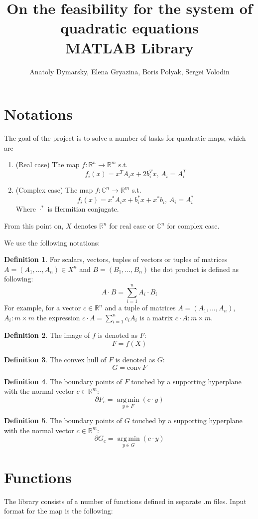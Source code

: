 \documentclass[a4paper]{article}
\title{On the feasibility for the system of quadratic equations\\MATLAB Library}
\date{}
\author{Anatoly Dymarsky, Elena Gryazina, Boris Polyak, Sergei Volodin}
\DeclareMathOperator*{\argmin}{arg\,min}
\newcommand{\conv}{\mbox{conv}\,}
\theoremstyle{definition}
\newtheorem{definition}{Definition}[section]
\begin{document}
\maketitle
\section{Notations}
The goal of the project is to solve a number of tasks for quadratic maps, which are
\begin{enumerate}
\item (Real case) The map $f\colon \mathbb{R}^n\to\mathbb{R}^m$ s.t. $$f_i(x)=x^TA_ix+2b_i^Tx,\, A_i=A_i^T$$
\item (Complex case) The map $f\colon \mathbb{C}^n\to\mathbb{R}^m$ s.t. $$f_i(x)=x^*A_ix+b_i^*x+x^*b_i,\, A_i=A_i^*$$
Where $\cdot^*$ is Hermitian conjugate.
\end{enumerate}

From this point on, $X$ denotes $\mathbb{R}^n$ for real case or $\mathbb{C}^n$ for complex case.

We use the following notations:
\theoremstyle{definition}
\begin{definition} For scalars, vectors, tuples of vectors or tuples of matrices $A=(A_1,...,A_n)\in X^n$ and $B=(B_1,...,B_n)$ the dot product is defined as following: $$A\cdot B=\sum\limits_{i=1}^nA_i\cdot B_i$$
For example, for a vector $c\in \mathbb{R}^n$ and a tuple of matrices $A=(A_1,...,A_n)$, $A_i\colon m\times m$ the expression $c\cdot A=\sum\limits_{i=1}^nc_iA_i$ is a matrix $c\cdot A\colon m\times m$.
\end{definition}
\begin{definition} The image of $f$ is denoted as $F$:
	$$F=f(X)$$
\end{definition}
\begin{definition} The convex hull of $F$ is denoted as $G$:
	$$G=\conv F$$
\end{definition}
\begin{definition} The boundary points of $F$ touched by a supporting hyperplane with the normal vector $c\in\mathbb{R}^m$:
	$$\partial F_c=\argmin\limits_{y\in F}(c\cdot y)$$
\end{definition}
\begin{definition} The boundary points of $G$ touched by a supporting hyperplane with the normal vector $c\in\mathbb{R}^m$:
	$$\partial G_c=\argmin\limits_{y\in G}(c\cdot y)$$
\end{definition}
\section{Functions}
The library consists of a number of functions defined in separate .m files. Input format for the map is the following: 
\end{document}
